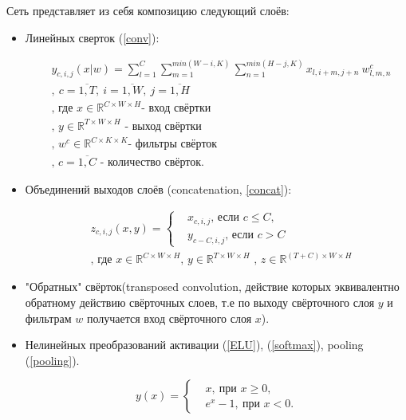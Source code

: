 \documentclass[12pt, a4paper]{extarticle}
\begin{document}
Сеть представляет из себя композицию следующий слоёв: 
\begin{itemize}
	\item Линейных сверток (\ref{conv}):
	
\begin{equation} \label{conv}
\begin{aligned}
	& y_{c, i, j}(x|w) = \sum \limits_{l=1}^{C} 
		\sum \limits_{m=1}^{min(W - i, K)}
		\sum \limits_{n=1}^{min(H - j, K)} 
		x_{l, i + m, j + n} \ w^c_{l, m, n} \\
	& ,\ c = \overline{1, T} 
		,\ i = \overline{1, W}
		,\ j = \overline{1, H} \\
	& \text{, где $x \in \mathbb{R}^{C \times W \times H}$
		- вход свёртки} \\
	& \text{, $y \in \mathbb{R}^{T \times W \times H}$ 
		- выход свёртки} \\
	& \text{, $w^c \in \mathbb{R}^{C \times K \times K}$
		- фильтры свёрток} \\
	& \text{, $c=\overline{1, C}$ - количество свёрток}.
\end{aligned}
\end{equation}

 	\item Объединений выходов слоёв (concatenation, \ref{concat}):
 
\begin{equation} \label{concat}
\begin{aligned}
	& z_{c, i, j}(x, y) = \begin{cases}
		& x_{c, i, j} \text{, если $c \leq C$,} \\
		& y_{c - C, i, j} \text{, если $c > C$}
	\end{cases} \\
	& \text{, где $x \in \mathbb{R}^{C \times W \times H}$
	,\ $y \in \mathbb{R}^{T \times W \times H}$ 
	,\ $z \in \mathbb{R}^{(T + C) \times W \times H}$}
\end{aligned}
\end{equation}

 	\item "Обратных" свёрток(transposed convolution, действие которых эквивалентно обратному действию свёрточных слоев, т.е по выходу свёрточного слоя $y$ и фильтрам $w$ получается вход свёрточного слоя $x$).
 	
 	\item Нелинейных преобразований
активации (\ref{ELU}), (\ref{softmax}), pooling (\ref{pooling}).

\begin{equation} \label{ELU}
	y(x) = \begin{cases} 
		& x ,\ \text{при $x \geq 0$}, \\	
		& e^x - 1 ,\ \text{при $x < 0$}.
	\end{cases}
\end{equation}


\end{itemize}
\end{document}
